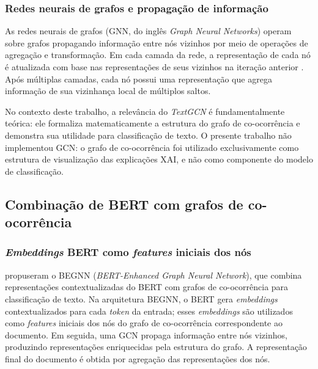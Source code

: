 \documentclass[
    12pt,                %
    openright,           %
    oneside,             %
    a4paper,             %
    english,             %
    brazil               %
]{abntex2}
\begin{document}
\subsubsection{Redes neurais de grafos e propagação de informação}
\label{subsubsec:textgcn_gcn}

As redes neurais de grafos (GNN, do inglês \textit{Graph Neural Networks}) operam sobre grafos propagando informação entre nós vizinhos por meio de operações de agregação e transformação. Em cada camada da rede, a representação de cada nó é atualizada com base nas representações de seus vizinhos na iteração anterior \cite{yao2019}. Após múltiplas camadas, cada nó possui uma representação que agrega informação de sua vizinhança local de múltiplos saltos.

No contexto deste trabalho, a relevância do \textit{TextGCN} é fundamentalmente teórica: ele formaliza matematicamente a estrutura do grafo de co-ocorrência e demonstra sua utilidade para classificação de texto. O presente trabalho não implementou GCN: o grafo de co-ocorrência foi utilizado exclusivamente como estrutura de visualização das explicações XAI, e não como componente do modelo de classificação.

\subsection{Combinação de BERT com grafos de co-ocorrência}
\label{subsec:bert_grafo}

\subsubsection{\textit{Embeddings} BERT como \textit{features} iniciais dos nós}
\label{subsubsec:bert_grafo_embeddings}

 propuseram o BEGNN (\textit{BERT-Enhanced Graph Neural Network}), que combina representações contextualizadas do BERT com grafos de co-ocorrência para classificação de texto. Na arquitetura BEGNN, o BERT gera \textit{embeddings} contextualizados para cada \textit{token} da entrada; esses \textit{embeddings} são utilizados como \textit{features} iniciais dos nós do grafo de co-ocorrência correspondente ao documento. Em seguida, uma GCN propaga informação entre nós vizinhos, produzindo representações enriquecidas pela estrutura do grafo. A representação final do documento é obtida por agregação das representações dos nós.
\end{document}
